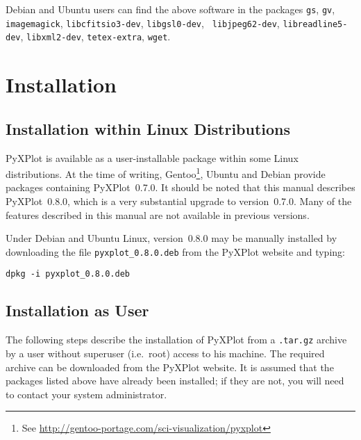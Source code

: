 Debian and Ubuntu users can find the above software in the packages {\tt gs},
{\tt gv}, {\tt imagemagick}, {\tt libcfitsio3-dev}, {\tt libgsl0-dev}, {\tt
libjpeg62-dev}, {\tt libreadline5-dev}, {\tt libxml2-dev}, {\tt tetex-extra},
{\tt wget}.

\section{Installation}

\subsection{Installation within Linux Distributions}

PyXPlot is available as a user-installable package within some Linux
distributions. At the time of writing, Gentoo\footnote{See
\url{http://gentoo-portage.com/sci-visualization/pyxplot}}, Ubuntu and Debian provide packages containing
PyXPlot~0.7.0. It should be noted that this manual describes PyXPlot~0.8.0,
which is a very substantial upgrade to version~0.7.0. Many of the features
described in this manual are not available in previous versions.

Under Debian and Ubuntu Linux, version~0.8.0 may be manually installed by
downloading the file {\tt pyxplot\_0.8.0.deb} from the PyXPlot website and
typing:

\begin{verbatim}
dpkg -i pyxplot_0.8.0.deb
\end{verbatim}

\subsection{Installation as User}

The following steps describe the installation of PyXPlot from a {\tt .tar.gz}
archive by a user without superuser (i.e.\ root) access to his machine. The
required archive can be downloaded from the PyXPlot website. It is assumed that
the packages listed above have already been installed; if they are not, you
will need to contact your system administrator.

